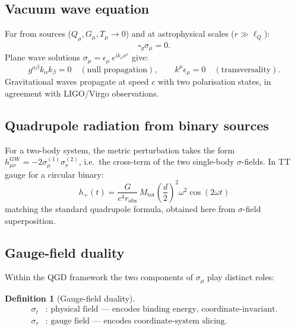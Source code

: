\documentclass[11pt,a4paper]{article}
\theoremstyle{plain}
\theoremstyle{definition}
\newtheorem{definition}[theorem]{Definition}
\theoremstyle{remark}
\newcommand{\lQ}{\ell_Q}
\newcommand{\boxg}{\square_g}
\begin{document}
\subsection{Vacuum wave equation}

Far from sources ($Q_\mu,G_\mu,T_\mu \to 0$) and at astrophysical scales ($r\gg\lQ$):
\begin{equation}
  \boxg\sigma_\mu = 0.
  \label{eq:vac_wave}
\end{equation}
Plane wave solutions $\sigma_\mu = \epsilon_\mu\,e^{ik_\nu x^\nu}$ give:
\begin{equation}
  g^{\alpha\beta}k_\alpha k_\beta = 0\quad(\text{null propagation}),
  \qquad k^\mu\epsilon_\mu = 0\quad(\text{transversality}).
\end{equation}
Gravitational waves propagate at speed $c$ with two polarisation states, in agreement
with LIGO/Virgo observations.

\subsection{Quadrupole radiation from binary sources}

For a two-body system, the metric perturbation takes the form
$h_{\mu\nu}^{\mathrm{GW}} = -2\sigma_\mu^{(1)}\sigma_\nu^{(2)}$, i.e.\ the
cross-term of the two single-body $\sigma$-fields.  In TT gauge for a circular binary:
\begin{equation}
  \boxed{h_+(t) = \frac{G}{c^4 r_{\mathrm{obs}}}\,M_{\mathrm{tot}}
    \!\left(\frac{d}{2}\right)^{\!2}\omega^2\cos(2\omega t)}
  \label{eq:quadrupole}
\end{equation}
matching the standard quadrupole formula, obtained here from $\sigma$-field superposition.

\subsection{Gauge-field duality}

Within the QGD framework the two components of $\sigma_\mu$ play distinct roles:

\begin{definition}[Gauge-field duality]
\begin{align*}
  \sigma_t &: \text{ physical field --- encodes binding energy, coordinate-invariant.}\\
  \sigma_r &: \text{ gauge field --- encodes coordinate-system slicing.}
\end{align*}
\end{definition}
\end{document}
